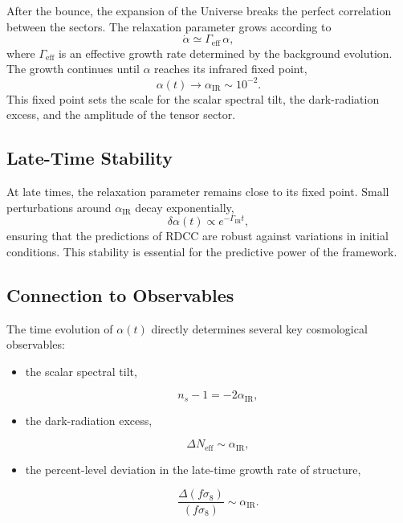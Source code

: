 \documentclass[11pt,a4paper]{article}
\begin{document}
After the bounce, the expansion of the Universe breaks the perfect correlation between
the sectors. The relaxation parameter grows according to
\begin{equation}
    \dot{\alpha} \simeq \Gamma_{\mathrm{eff}}\, \alpha,
\end{equation}
where $\Gamma_{\mathrm{eff}}$ is an effective growth rate determined by the background
evolution. The growth continues until $\alpha$ reaches its infrared fixed point,
\begin{equation}
    \alpha(t) \to \alpha_{\mathrm{IR}} \sim 10^{-2}.
\end{equation}
This fixed point sets the scale for the scalar spectral tilt, the dark-radiation excess,
and the amplitude of the tensor sector.

\subsection{Late-Time Stability}

At late times, the relaxation parameter remains close to its fixed point. Small
perturbations around $\alpha_{\mathrm{IR}}$ decay exponentially,
\begin{equation}
    \delta\alpha(t) \propto e^{-\Gamma_{\mathrm{IR}} t},
\end{equation}
ensuring that the predictions of RDCC are robust against variations in initial
conditions. This stability is essential for the predictive power of the framework.

\subsection{Connection to Observables}

The time evolution of $\alpha(t)$ directly determines several key cosmological
observables:
\begin{itemize}
    \item the scalar spectral tilt,
    

\[
        n_s - 1 = -2\alpha_{\mathrm{IR}},
    \]


    \item the dark-radiation excess,
    

\[
        \Delta N_{\mathrm{eff}} \sim \alpha_{\mathrm{IR}},
    \]


    \item the percent-level deviation in the late-time growth rate of structure,
    

\[
        \frac{\Delta(f\sigma_8)}{(f\sigma_8)} \sim \alpha_{\mathrm{IR}}.
    \]


\end{itemize}
\end{document}
